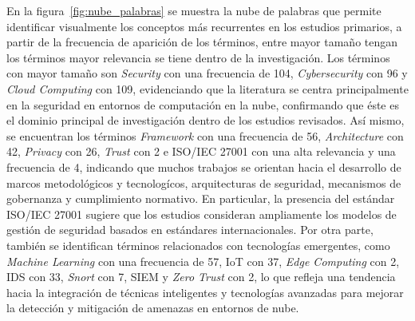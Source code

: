En la figura~\ref{fig:nube_palabras} se muestra la nube de palabras que permite identificar visualmente los conceptos más recurrentes en 
los estudios primarios, a partir de la frecuencia de aparición de los términos, entre mayor tamaño tengan los términos mayor relevancia se 
tiene dentro de la investigación. Los términos con mayor tamaño son \textit{Security} con una frecuencia de 104, \textit{Cybersecurity} 
con 96 y \textit{Cloud Computing} con 109, evidenciando que la literatura se centra principalmente en la seguridad en entornos de 
computación en la nube, confirmando que éste es el dominio principal de investigación dentro de los estudios revisados. Así mismo, 
se encuentran los términos \textit{Framework} con una frecuencia de 56, \textit{Architecture} con 42, \textit{Privacy} con 26, 
\textit{Trust} con 2 e ISO/IEC 27001 con una alta relevancia y una frecuencia de 4, indicando que muchos trabajos se orientan hacia 
el desarrollo de marcos metodológicos y tecnologícos, arquitecturas de seguridad, mecanismos de gobernanza y cumplimiento normativo. 
En particular, la presencia del estándar ISO/IEC 27001 sugiere que los estudios consideran ampliamente los modelos de gestión de 
seguridad basados en estándares internacionales. Por otra parte, también se identifican términos relacionados con tecnologías 
emergentes, como \textit{Machine Learning} con una frecuencia de 57, IoT con 37, \textit{Edge Computing} con 2, IDS con 33, 
\textit{Snort} con 7, SIEM y \textit{Zero Trust} con 2, lo que refleja una tendencia hacia la integración de técnicas inteligentes y 
tecnologías avanzadas para mejorar la detección y mitigación de amenazas en entornos de nube.